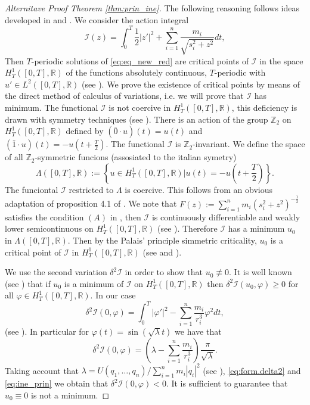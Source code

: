 \documentclass[twoside]{article}
\theoremstyle{remark}
\newcommand{\rr}{\mathbb{R}}
\begin{document}
\begin{proof}[Alternitave Proof Theorem \ref{thm:prin_ine}] The following reasoning follows ideas developed in \cite{zhao2015nonplanar} and \cite{li2013characterization}.  We consider the action integral
\[\mathcal{I}(z)=\int_0^T\frac12|z'|^2+\sum_{i=1}^n\frac{m_i}{\sqrt{s_i^2+z^2}}dt,\]
Then $T$-periodic solutions of \eqref{eq:eq_new_red} are critical points of $\mathcal{I}$ in the space $H^1_T([0,T],\rr)$ of the functions  absolutely continuous, $T$-periodic with $u'\in L^2([0,T],\rr)$ (see \cite[Cor. 1.1]{Mawhin2010}). We prove the existence of critical points by means of the direct method of calculus of variations, i.e. we will prove that $\mathcal{I}$ has minimum.  The functional $\mathcal{I}$ is not coercive in $H^1_T([0,T],\rr)$,  this deficiency is drawn with symmetry techniques (see \cite{David-2004}). There is an action of the group $\mathbb{Z}_2$ on $H^1_T([0,T],\rr)$ defined by $(\bar{0}\cdot u)(t)=u(t)$ and $(\bar{1}\cdot u)(t)=-u(t+\frac{T}{2})$. The functional $\mathcal{I}$ is $\mathbb{Z}_2$-invariant. We define the space of all $\mathbb{Z}_2$-symmetric funcions (assosiated to the italian symetry) \[\Lambda([0,T],\mathbb{R}):=\left\{ u\in H^1_T([0,T],\rr) | u(t)=-u\left(t+\frac{T}{2}\right)\right\}.\]
The funciontal $\mathcal{I}$ restricted to $\Lambda$  is coercive. This follows from an obvious adaptation of proposition 4.1 of \cite{David-2004}. We note that $F(z):=\sum_{i=1}^nm_i(s_i^2+z^2)^{-\frac{1}{2}}$ satisfies the condition $(A)$ in \cite[p. 12]{Mawhin2010}, then $\mathcal{I}$  is continuously differentiable and weakly lower semicontinuous on $H_{T}^1([0,T],\rr)$ (see \cite[p. 13]{Mawhin2010}). Therefore $\mathcal{I}$ has a minimum $u_0$ in $\Lambda([0,T],\mathbb{R})$. Then by the Palais' principle simmetric criticality,  $u_0$ is a critical point of $\mathcal{I}$ in $H^1_T([0,T],\rr)$ (see \cite{David-2004} and \cite{RichardPalais274}).

We use the second variation $\delta^2 \mathcal{I}$ in order to show  that $u_0\nequiv 0$. It is well known (see \cite[Th. 1.3.1]{jost1998calculus}) that if $u_0$ is a minimum of $\mathcal{I}$ on $H^1_T([0,T],\rr)$  then $\delta^2 \mathcal{I} (u_0,\varphi)\geq 0$ for all $\varphi\in H^1_T([0,T],\rr)$. In our case
\[\delta^2\mathcal{I}(0,\varphi)=\int_0^T |\varphi'|^2-\sum_{i=1}^{n}\frac{m_i}{r_i^3}\varphi^2 dt,\]
(see \cite[Eq. 1.3.6]{jost1998calculus}). In particular for $\varphi(t)=\sin (\sqrt{\lambda}t)$ we have that
\begin{equation}\label{eq:form.delta2}
 \delta^2 \mathcal{I} (0,\varphi)=\left( \lambda-\sum_{i=1}^{n}\frac{m_i}{r_i^3} \right)\frac{\pi}{\sqrt{\lambda}}.
\end{equation}
Taking account that $\lambda=U(q_1,\ldots,q_n)/\sum_{i=1}^{n}m_i|q_i|^2$  (see \cite[p. 109]{JaumeLlibre276}),  \eqref{eq:form.delta2} and \eqref{eq:ine_prin} we obtain that $\delta^2\mathcal{I}(0,\varphi)<0$. It is sufficient  to guarantee that $u_0\equiv 0$ is not a minimum.



\end{proof}
\end{document}
